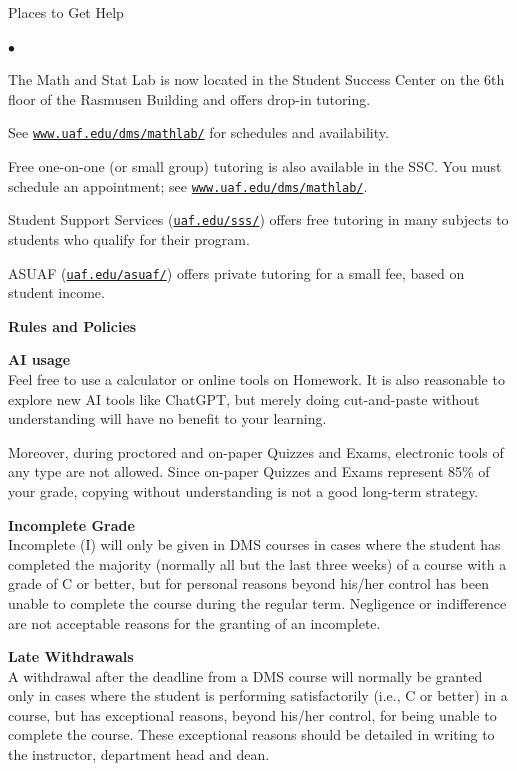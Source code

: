 \documentclass[12pt]{article}
\renewcommand{\emph}[1]{\textsf{\textbf{#1}}}
\newcommand{\localhead}[1]{\par\smallskip\textbf{#1} \smallskip\nobreak\\}%
\def\heading#1{\localhead{\large\emph{#1}}}
\def\subheading#1{\localhead{\emph{#1}}}
\newenvironment{clist}%
{\bgroup\parskip 0pt\begin{list}{$\bullet$}{\partopsep 4pt\topsep 0pt\itemsep -2pt}}%
{\end{list}\egroup}%
\begin{document}
Places to Get Help

\vskip -20pt\strut
\begin{clist}
    \item The Math and Stat Lab is now located in the
      Student Success Center on the 6th floor of the Rasmusen Building and
      offers drop-in tutoring.

	See \href{http://www.uaf.edu/dms/mathlab/}{\texttt{www.uaf.edu/dms/mathlab/}} for schedules and availability.
	\item Free
one-on-one (or small group) tutoring is also available in 
the SSC. You must schedule an
appointment; see \href{http://www.uaf.edu/dms/mathlab/}{\texttt{www.uaf.edu/dms/mathlab/}}.
	\item Student Support Services (\href{https://uaf.edu/sss/}{\texttt{uaf.edu/sss/}}) offers free tutoring in many subjects to students who qualify for their program.
	\item ASUAF (\href{https://uaf.edu/asuaf/}{\texttt{uaf.edu/asuaf/}}) offers private tutoring for a small fee, based on student income.
\end{clist}


\clearpage\newpage
\phantom{x}
\vspace{-4mm}

\heading{Rules and Policies}
\vskip -20pt

\subheading{AI usage}
Feel free to use a calculator or online tools on Homework.  It is also reasonable to explore new AI tools like ChatGPT, but merely doing cut-and-paste without understanding will have no benefit to your learning. 

Moreover, during proctored and on-paper Quizzes and Exams, electronic tools of any type are not allowed.  Since on-paper Quizzes and Exams represent 85\% of your grade, copying without understanding is not a good long-term strategy.

\subheading{Incomplete Grade} 
Incomplete (I) will only be given in
  DMS courses in cases where
  the student has completed the majority (normally all but the last
  three weeks) of a course with a grade of C or better, but for
  personal reasons beyond his/her control has been unable to complete
  the course during the regular term. Negligence or indifference are
  not acceptable reasons for the granting of an incomplete. 

\subheading{Late Withdrawals} 
A withdrawal after the deadline from a DMS course will
  normally be granted only in cases where the student is performing
  satisfactorily (i.e., C or better) in a course, but has exceptional
  reasons, beyond his/her control, for being unable to complete the
  course. These exceptional reasons should be detailed in writing to
  the instructor, department head and dean.
\end{document}
